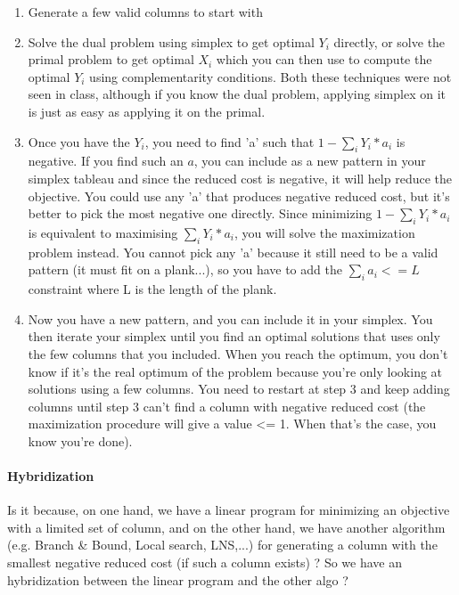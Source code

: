 \begin{enumerate}
    \item Generate a few valid columns to start with

    \item  Solve the dual problem using simplex to get optimal $Y_i$ directly,
        or solve the primal problem to get optimal $X_i$ which you can then
        use to compute the optimal $Y_i$ using complementarity conditions.
        Both these techniques were not seen in class, although if you know
        the dual problem, applying simplex on it is just as easy as applying
        it on the primal.

    \item  Once you have the $Y_i$, you need to find 'a' such that $1 - \sum_i
        Y_i * a_i$ is negative. If you find such an $a$, you can include as a
        new pattern in your simplex tableau and since the reduced cost is
        negative, it will help reduce the objective. You could use any 'a'
        that produces negative reduced cost, but it's better to pick the
        most negative one directly. Since minimizing $1-\sum_i Y_i*a_i$ is
        equivalent to maximising $\sum_i Y_i * a_i$, you will solve the
        maximization problem instead. You cannot pick any 'a' because it
        still need to be a valid pattern (it must fit on a plank...), so you
        have to add the $\sum_i a_i <= L$ constraint where L is the length of
        the plank.

    \item  Now you have a new pattern, and you can include it in your
        simplex. You then iterate your simplex until you find an optimal
        solutions that uses only the few columns that you included. When you
        reach the optimum, you don't know if it's the real optimum of the
        problem because you're only looking at solutions using a few
        columns. You need to restart at step 3 and keep adding columns until
        step 3 can't find a column with negative reduced cost (the
        maximization procedure will give a value <= 1. When that's the case,
        you know you're done).
\end{enumerate}

\paragraph{Hybridization}

Is it because, on one hand, we have a linear program for minimizing an
objective with a limited set of column, and on the other hand, we have
another algorithm (e.g. Branch \& Bound, Local search, LNS,...) for
generating a column with the smallest negative reduced cost (if such a
column exists) ?
So we have an hybridization between the linear program and the other
algo ?


